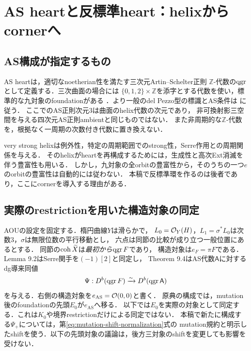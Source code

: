 \section{AS heartと反標準heart：helixからcornerへ}\label{sec:AS}
\subsection{AS構成が指定するもの}
AS heartは，適切なnoetherian性を満たす三次元Artin--Schelter正則
$\mathbb Z$-代数の$\operatorname{qgr}$として定義する．三次曲面の場合には
$\{0,1,2\}\times\mathbb Z$を添字とする代数を使い，標準的な九対象のfoundationがある
\cite[\S3--4]{AOU}．より一般のdel Pezzo型の標識とAS条件は
\cite[Definitions 1.1, 3.1]{OU}に従う．
ここでのAS正則次元3は曲面のhelix代数の次元であり，
非可換射影三空間を与える四次元AS正則ambientと同じものではない．
また非周期的な$\mathbb Z$-代数を，根拠なく一周期の次数付き代数に置き換えない．

very strong helixは例外性，特定の周期範囲でのstrong性，Serre作用との周期関係を与える．
そのhelixがheartを再構成するためには，生成性と高次Ext消滅を伴う豊富性も用いる．
しかし，九対象の全orbitの豊富性から，そのうちの一つ$e$のorbitの豊富性は自動的には従わない．
本稿で反標準環を作るのは後者であり，ここにcornerを導入する理由がある．

\subsection{実際のrestrictionを用いた構造対象の同定}
AOU\cite[\S9]{AOU}の設定を固定する．楕円曲線$Y$は滑らかで，
$L_0=\mathcal O_Y(H)$，$L_1=\sigma^*L_0$は次数3，$\sigma$は無限位数の平行移動とし，
六点は同節の比較が成り立つ一般位置にあるとする．
同節の$\operatorname{coh}\widetilde X$は\emph{最初から}$\operatorname{qgr} F$であり，
構造対象は$e_F=\pi F$である．Lemma 9.2はSerre関手を$(-1)[2]$と同定し，
Theorem 9.4はAS代数$\mathsf A$に対するdg導来同値
\begin{equation}\label{eq:AOU}
\Psi:D^b(\operatorname{qgr} F)\xrightarrow{\sim}D^b(\operatorname{qgr}\mathsf A)
\end{equation}
を与える．右側の構造対象を$e_{\mathrm{AS}}=\mathcal O(0,0)$と書く．
原典の構成では，mutation後のfoundationの先頭$E_0$が$e_{\mathrm{AS}}$へ移る．
以下では$E_0$を実際の対象として同定する．これは$K_0$や境界restrictionだけによる同定ではない．
本稿で新たに構成する$\Psi_+$については，第\ref{eq:mutation-shift-normalization}式の
mutation規約と明示したshiftを使う．以下の先頭対象の議論は，後方三対象のshiftを変更しても影響を受けない．

